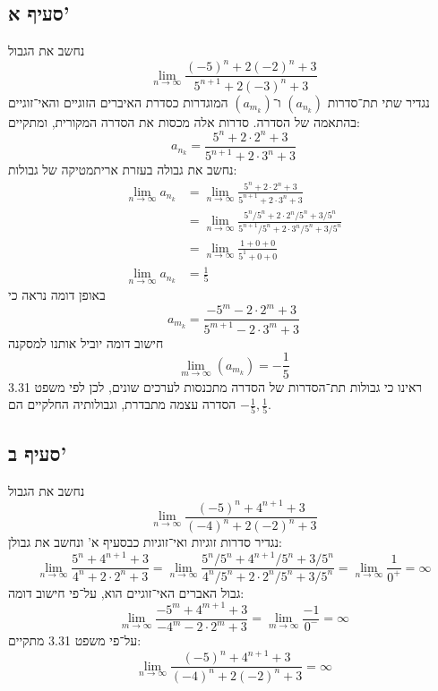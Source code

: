 \subsection{סעיף א'}
נחשב את הגבול
\[
	\lim_{n \to \infty}
	\frac{{(-5)}^n + 2{(-2)}^n + 3}{5^{n + 1} + 2{(-3)}^n + 3}
\]
נגדיר שתי תת־סדרות $(a_{n_k})$ ו־$(a_{m_k})$
המוגדרות כסדרת האיברים הזוגיים והאי־זוגיים בהתאמה של הסדרה.
סדרות אלה מכסות את הסדרה המקורית, ומתקיים:
\[
	a_{n_k} = \frac{{5}^n + 2 \cdot 2^n + 3}{5^{n + 1} + 2 \cdot 3^n + 3}
\]
נחשב את גבולה בעזרת אריתמטיקה של גבולות:
\begin{align*}
	\lim_{n \to \infty} a_{n_k}
	& = \lim_{n \to \infty} \frac{{5}^n + 2 \cdot 2^n + 3}{5^{n + 1} + 2 \cdot 3^n + 3} \\
	& = \lim_{n \to \infty} \frac{{5}^n/5^n + 2 \cdot 2^n / 5^n + 3/5^n}{5^{n + 1}/5^n + 2 \cdot 3^n/5^n + 3/5^n} \\
	& = \lim_{n \to \infty} \frac{1 + 0 + 0}{5^1 + 0 + 0} \\
	\lim_{n \to \infty} a_{n_k} & = \frac{1}{5}
\end{align*}
באופן דומה נראה כי
\[
	a_{m_k} = \frac{-{5}^m - 2 \cdot 2^m + 3}{5^{m + 1} - 2 \cdot 3^m + 3}
\]
חישוב דומה יוביל אותנו למסקנה
\[
	\lim_{m \to \infty} (a_{m_k}) = -\frac{1}{5}
\]
ראינו כי גבולות תת־הסדרות של הסדרה מתכנסות לערכים שונים,
לכן לפי משפט 3.31 הסדרה עצמה מתבדרת,
וגבולותיה החלקיים הם $-\frac{1}{5}, \frac{1}{5}$.

\subsection{סעיף ב'}
נחשב את הגבול
\[
	\lim_{n \to \infty} \frac{{(-5)}^n + 4^{n + 1} + 3}{{({-4})}^n + 2{(-2)}^n + 3}
\]
נגדיר סדרות זוגיות ואי־זוגיות כבסעיף א' ונחשב את גבולן:
\[
	\lim_{n \to \infty} \frac{5^n + 4^{n + 1} + 3}{4^n + 2 \cdot 2^n + 3}
	= \lim_{n \to \infty} \frac{5^n/5^n + 4^{n + 1}/5^n + 3/5^n}{4^n/5^n + 2 \cdot 2^n/5^n + 3/5^n}
	= \lim_{n \to \infty} \frac{1}{0^+}
	= \infty
\]
גבול האברים האי־זוגיים הוא, על־פי חישוב דומה:
\[
	\lim_{m \to \infty} \frac{-5^m + 4^{m + 1} + 3}{-4^m - 2 \cdot 2^m + 3}
	= \lim_{m \to \infty} \frac{-1}{0^-}
	= \infty
\]
על־פי משפט 3.31 מתקיים:
\[
	\lim_{n \to \infty} \frac{{(-5)}^n + 4^{n + 1} + 3}{{({-4})}^n + 2{(-2)}^n + 3} = \infty
\]

